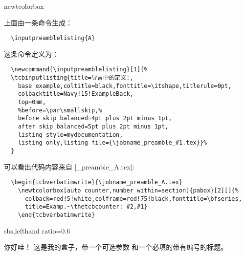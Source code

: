 \begin{docCommand}{newtcolorbox}{}


\begin{tcolorbox}[breakable, title=译者对上面这个盒子的分析]
  上面由一条命令生成：

  \begin{verbatim}
  \inputpreamblelisting{A}
  \end{verbatim}

  \tcbline  

  这条命令定义为：
  \begin{verbatim}
  \newcommand{\inputpreamblelisting}[1]{%
  \tcbinputlisting{title=导言中的定义:,
    base example,coltitle=black,fonttitle=\itshape,titlerule=0pt,
    colbacktitle=Navy!15!ExampleBack,
    top=0mm,
    %before=\par\smallskip,%
    before skip balanced=4pt plus 2pt minus 1pt,
    after skip balanced=5pt plus 2pt minus 1pt,
    listing style=mydocumentation,
    listing only,listing file={\jobname_preamble_#1.tex}}%
  }
  \end{verbatim}

  \tcbline  

  可以看出代码内容来自 |\jobname_preamble_A.tex|\footnotemark:
  \begin{verbatim}
  \begin{tcbverbatimwrite}{\jobname_preamble_A.tex}
    \newtcolorbox[auto counter,number within=section]{pabox}[2][]{%
      colback=red!5!white,colframe=red!75!black,fonttitle=\bfseries,
      title=Examp.~\thetcbcounter: #2,#1}
    \end{tcbverbatimwrite}
  \end{verbatim}
\end{tcolorbox}

\begin{dispExample*}{sbs,lefthand ratio=0.6}
\begin{pabox}[colback=yellow]{你好哇！}
这是我的盒子，带一个可选参数%
和一个必填的带有编号的标题。
\end{pabox}
\end{dispExample*}
\end{docCommand}


